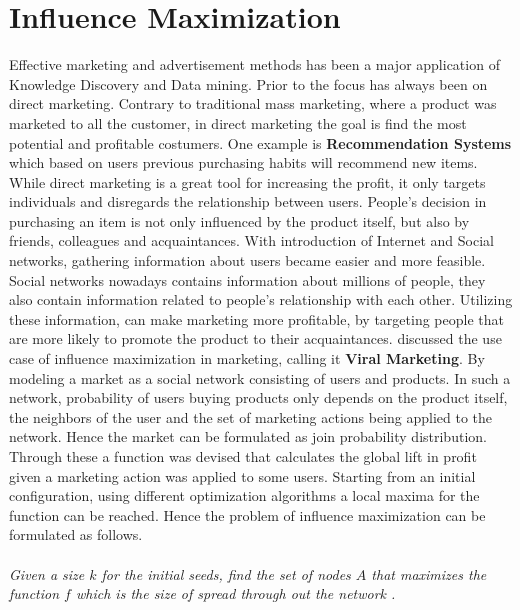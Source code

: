 \documentclass[english]{tktltiki}
\begin{document}
\section{Influence Maximization}
Effective marketing and advertisement methods has been a major application of Knowledge Discovery and Data mining. Prior to \cite{domingo01} the focus has always been on direct marketing. Contrary to traditional mass marketing, where a product was marketed to all the customer, in direct marketing the goal is find the most potential and profitable costumers.  One example is \textbf{Recommendation Systems} which based on users previous purchasing habits will recommend new items. While direct marketing is a great tool for increasing the profit, it only targets individuals and disregards the relationship between users. People's decision in purchasing an item is not only influenced by the product itself, but also by friends, colleagues and acquaintances. With introduction of Internet and Social networks, gathering information about users became easier and more feasible. Social networks nowadays contains information about millions of people, they also contain information related to people's relationship with each other. Utilizing these information, can make marketing more profitable, by targeting people that are more likely to promote the product to their acquaintances. 
\cite{domingo01} discussed the use case of influence maximization in marketing, calling it \textbf{Viral Marketing}. By modeling a market as a social network consisting of users and products. In such a network, probability of users buying products only depends on the product itself, the neighbors of the user and the set of marketing actions being applied to the network. Hence the market can be formulated as join probability distribution. 
Through these a function was devised that calculates the global lift in profit given a marketing action was applied to some users. Starting from an initial configuration, using different optimization algorithms a local maxima for the function can be reached. Hence the problem of influence maximization can be formulated as follows. \\ \\
\textit{Given a size $k$ for the initial seeds, find the set of nodes $A$ that maximizes the function $f$ which is the size of spread through out the network . }\\ \\
\end{document}
